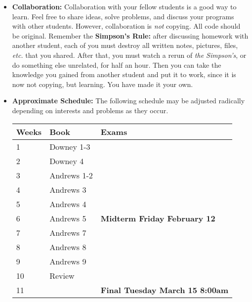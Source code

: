 \documentclass{article}
\begin{document}
\begin{itemize}
\item {\bf Collaboration:} Collaboration with your fellow students is
  a good way to learn.  Feel free to share ideas, solve problems, and
  discuss your programs with other students.  However, collaboration
  is {\em not} copying.  All code should be original.  Remember the
  {\bf Simpson's Rule:} after discussing homework with another
  student, each of you must destroy all written notes, pictures,
  files, {\em etc.} that you shared.  After that, you must watch a
  rerun of {\em the Simpson's}, or do something else unrelated, for
  half an hour.  Then you can take the knowledge you gained from
  another student and put it to work, since it is now not copying, but
  learning.  You have made it your own.

\item
{\bf Approximate Schedule:} The following schedule may be adjusted
radically depending on interests and problems as they occur.

\begin{tabular}{|l|l|l|}\hline
Weeks & Book & Exams \\\hline
1 & Downey  1-3 & \\
2 & Downey  4  & \\
3 & Andrews 1-2  & \\
4 & Andrews 3 & \\
5 & Andrews 4 & \\\hline
6 & Andrews 5 & { \bf Midterm Friday February 12} \\\hline
7 & Andrews 7 & \\
8 & Andrews 8 & \\
9 & Andrews 9 & \\
10 & Review  & \\\hline
11&& {\bf Final Tuesday March 15 8:00am}\\\hline
\end{tabular}
\end{itemize}
\end{document}
